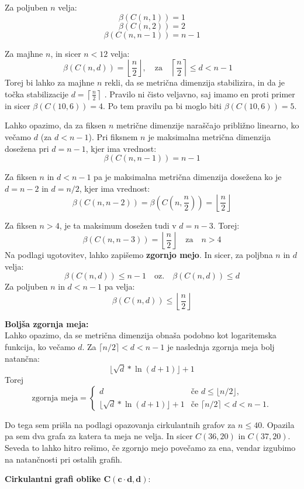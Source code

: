 \documentclass[a4paper,12pt]{article}
\theoremstyle{definition}
\theoremstyle{remark}
\theoremstyle{definition}
\begin{document}
Za poljuben $n$ velja:
\[
    \beta(C(n, 1)) = 1
\]
\[
    \beta(C(n, 2)) = 2
\]
\[
    \beta(C(n, n-1)) = n-1
\]

\noindent
Za majhne $n$, in sicer $n < 12$ velja:
\[
    \beta(C(n, d)) = \left\lfloor \frac{n}{2} \right\rfloor, \quad \text{za} \quad \left\lceil \frac{n}{2} \right\rceil \leq d < n-1 \quad
\]
\noindent
Torej bi lahko za majhne $n$ rekli, da se metrična dimenzija stabilizira, in da je točka stabilizacije $ d = \left\lceil \frac{n}{2} \right\rceil$ .
Pravilo ni čisto veljavno, saj imamo en proti primer in sicer $\beta(C(10, 6)) = 4$. Po tem pravilu pa bi moglo biti $\beta(C(10, 6)) = 5$. 
\\

\par 
\noindent
Lahko opazimo, da za fiksen $n$ metrične dimenzije naraščajo približno linearno, ko večamo $d$ (za $d < n-1$).
Pri fiksnem $n$ je maksimalna metrična dimenzija dosežena pri $d = n - 1$, kjer ima vrednost: 
\[
    \beta(C(n, n-1)) = n-1
\]

\noindent
Za fiksen $n$ in $d < n - 1$ pa je maksimalna metrična dimenzija dosežena ko je $d = n -2$ in $d = n/2$, 
kjer ima vrednost:
\[
    \beta(C(n, n-2)) = \beta\left(C\left(n, \frac{n}{2}\right)\right) = \left\lfloor \frac{n}{2} \right\rfloor
\]

\noindent
Za fiksen $n > 4$, je ta maksimum dosežen tudi v $d = n - 3$. Torej:
\[
    \beta(C(n, n-3)) = \left\lfloor \frac{n}{2} \right\rfloor \quad \text{za} \quad n > 4
\]
\noindent
Na podlagi ugotovitev, lahko zapišemo \textbf{zgornjo mejo}. In sicer, za poljbna $n$ in $d$ velja:
\[\beta(C(n,d)) \leq n - 1 \quad \text{oz.} \quad  \beta(C(n,d)) \leq d\]  
\noindent
Za poljuben $n$ in $d < n-1$ pa velja:
\[\beta(C(n ,d)) \leq \left\lfloor \frac{n}{2} \right\rfloor\]

\par
\noindent
\textbf{Boljša zgornja meja:}\\
\noindent
Lahko opazimo, da se metrična dimenzija obnaša podobno kot logaritemska funkcija, ko večamo $d$.
Za $ \lceil n/2 \rceil < d < n-1$ je naslednja zgornja meja bolj natančna:
\[ \lfloor \sqrt{d}*\ln(d + 1) \rfloor + 1  
\]
\noindent
Torej
\[
\text{zgornja meja} = 
\begin{cases} 
d & \text{če } d \leq  \lfloor n/2 \rfloor, \\
\lfloor \sqrt{d}*\ln(d + 1) \rfloor + 1   & \text{če } \lceil n/2 \rceil < d < n-1.
\end{cases}
\]

\noindent
Do tega sem prišla na podlagi opazovanja cirkulantnih grafov za $n \leqslant 40$. 
Opazila pa sem dva grafa za katera ta meja ne velja. In sicer $C(36,20)$ in $C(37,20)$. Seveda 
to lahko hitro rešimo, če zgornjo mejo povečamo za ena, vendar izgubimo na natančnosti pri ostalih grafih.
\bigskip
\par
\noindent
\textbf{Cirkulantni grafi oblike $\mathbf{C( c\cdot d, d )}$}:
\end{document}
